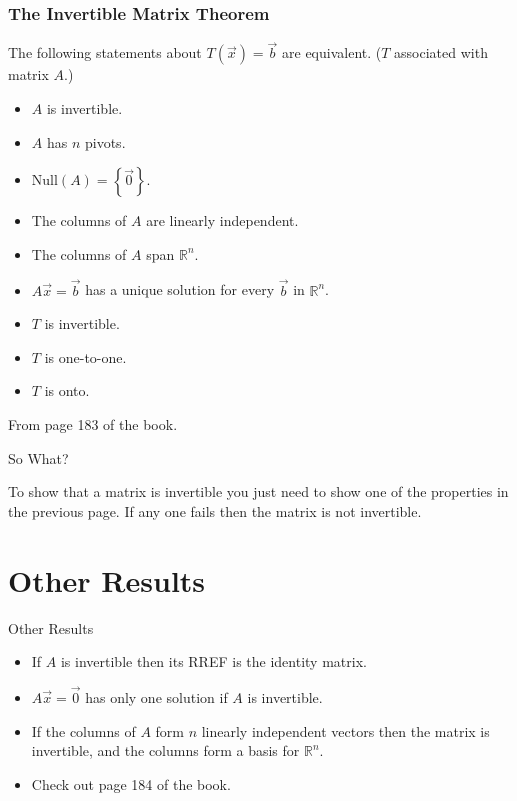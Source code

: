 \documentclass[svgnames,table,,aspectratio=169]{beamer}
\begin{document}
\begin{frame}
  \frametitle{The Invertible Matrix Theorem}

  The following statements about $T\left(\vec{x}\right)=\vec{b}$ are
  equivalent. ($T$ associated with matrix $A$.)
  \begin{itemize}
  \item $A$ is invertible.
  \item $A$ has $n$ pivots.
  \item $\mathrm{Null}(A)=\left\{\vec{0}\right\}$.
  \item The columns of $A$ are linearly independent.
  \item The columns of $A$ span $\mathbb{R}^n$.
  \item $A\vec{x}=\vec{b}$ has a unique solution for every $\vec{b}$
    in $\mathbb{R}^n$.
  \item $T$ is invertible.
  \item $T$ is one-to-one.
  \item $T$ is onto.
  \end{itemize}

  From page 183 of the book.
  
\end{frame}

\begin{frame}{So What?}

  To show that a matrix is invertible you just need to show one of the
  properties in the previous page. If any one fails then the matrix is
  not invertible.
  
\end{frame}

\section{Other Results}

\begin{frame}{Other Results}

  \begin{itemize}
  \item If $A$ is invertible then its RREF is the identity matrix.
  \item $A\vec{x}=\vec{0}$ has only one solution if $A$ is invertible.
  \item If the columns of $A$ form $n$ linearly independent vectors
    then the matrix is invertible, and the columns form a basis for
    $\mathbb{R}^n$.
  \item Check out page 184 of the book.
  \end{itemize}
\end{frame}
\end{document}
